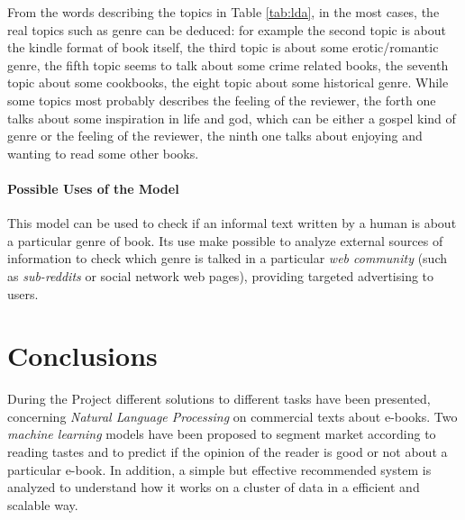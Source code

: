 \documentclass[fleqn,10pt]{SelfArx}
\begin{document}
From the words describing the topics in Table \ref{tab:lda}, in the most cases, the real topics such as genre can be deduced: for example the second topic is about the kindle format of book itself, the third topic is about some erotic/romantic genre, the fifth topic seems to talk about some crime related books, the seventh topic about some cookbooks, the eight topic about some historical genre.
While some topics most probably describes the feeling of the reviewer, the forth one talks about some inspiration in life and god, which can be either a gospel kind of genre or the feeling of the reviewer, the ninth one talks about enjoying and wanting to read some other books.

\subsection{Possible Uses of the Model}
This model can be used to check if an informal text written by a human is about a particular genre of book.
Its use make possible to analyze external sources of information to check which genre is talked in a particular \textit{web community} (such as \textit{sub-reddits} or social network web pages), providing targeted advertising to users.



\newpage
\part*{Conclusions}
During the Project different solutions to different tasks have been presented, concerning \textit{Natural Language Processing} on commercial texts about e-books.
Two \textit{machine learning} models have been proposed to segment market according to reading tastes and to predict if the opinion of the reader is good or not about a particular e-book.
In addition, a simple but effective recommended system is analyzed to understand how it works  on a cluster of data in a efficient and scalable way.

\newpage
\nocite{*}
\printbibliography


\end{document}
